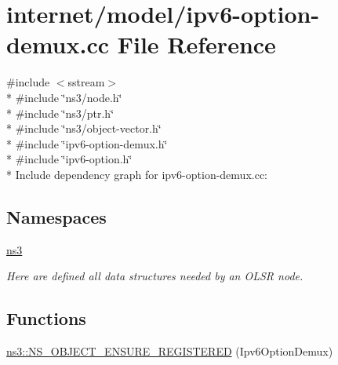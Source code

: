 \hypertarget{ipv6-option-demux_8cc}{}\section{internet/model/ipv6-\/option-\/demux.cc File Reference}
\label{ipv6-option-demux_8cc}
{\ttfamily \#include $<$sstream$>$}\\*
{\ttfamily \#include \char`\"{}ns3/node.\+h\char`\"{}}\\*
{\ttfamily \#include \char`\"{}ns3/ptr.\+h\char`\"{}}\\*
{\ttfamily \#include \char`\"{}ns3/object-\/vector.\+h\char`\"{}}\\*
{\ttfamily \#include \char`\"{}ipv6-\/option-\/demux.\+h\char`\"{}}\\*
{\ttfamily \#include \char`\"{}ipv6-\/option.\+h\char`\"{}}\\*
Include dependency graph for ipv6-\/option-\/demux.cc\+:
\subsection*{Namespaces}
\begin{DoxyCompactItemize}
\item 
 \hyperlink{namespacens3}{ns3}
\begin{DoxyCompactList}\small\item\em Here are defined all data structures needed by an O\+L\+SR node. \end{DoxyCompactList}\end{DoxyCompactItemize}
\subsection*{Functions}
\begin{DoxyCompactItemize}
\item 
\hyperlink{namespacens3_a90e117454c67129fcd28ddd42a8b98ea}{ns3\+::\+N\+S\+\_\+\+O\+B\+J\+E\+C\+T\+\_\+\+E\+N\+S\+U\+R\+E\+\_\+\+R\+E\+G\+I\+S\+T\+E\+R\+ED} (Ipv6\+Option\+Demux)
\end{DoxyCompactItemize}
